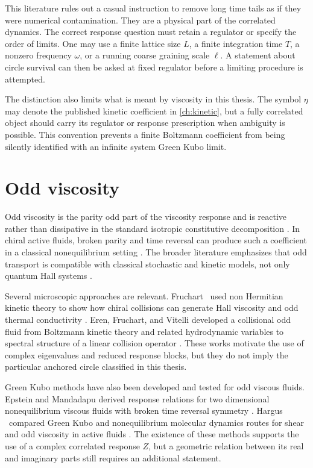 This literature rules out a casual instruction to remove long time tails as if they were numerical contamination. They are a physical part of the correlated dynamics. The correct response question must retain a regulator or specify the order of limits. One may use a finite lattice size $L$, a finite integration time $T$, a nonzero frequency $\omega$, or a running coarse graining scale $\ell$. A statement about circle survival can then be asked at fixed regulator before a limiting procedure is attempted.

The distinction also limits what is meant by viscosity in this thesis. The symbol $\eta$ may denote the published kinetic coefficient in \cref{ch:kinetic}, but a fully correlated object should carry its regulator or response prescription when ambiguity is possible. This convention prevents a finite Boltzmann coefficient from being silently identified with an infinite system Green Kubo limit.

\section{Odd viscosity}
Odd viscosity is the parity odd part of the viscosity response and is reactive rather than dissipative in the standard isotropic constitutive decomposition \cite{Avron1998}. In chiral active fluids, broken parity and time reversal can produce such a coefficient in a classical nonequilibrium setting \cite{Banerjee2017}. The broader literature emphasizes that odd transport is compatible with classical stochastic and kinetic models, not only quantum Hall systems \cite{FruchartReview2023}.

Several microscopic approaches are relevant. Fruchart \etal\ used non Hermitian kinetic theory to show how chiral collisions can generate Hall viscosity and odd thermal conductivity \cite{Fruchart2022}. Eren, Fruchart, and Vitelli developed a collisional odd fluid from Boltzmann kinetic theory and related hydrodynamic variables to spectral structure of a linear collision operator \cite{Eren2026}. These works motivate the use of complex eigenvalues and reduced response blocks, but they do not imply the particular anchored circle classified in this thesis.

Green Kubo methods have also been developed and tested for odd viscous fluids. Epstein and Mandadapu derived response relations for two dimensional nonequilibrium viscous fluids with broken time reversal symmetry \cite{Epstein2020}. Hargus \etal\ compared Green Kubo and nonequilibrium molecular dynamics routes for shear and odd viscosity in active fluids \cite{Hargus2020}. The existence of these methods supports the use of a complex correlated response $Z$, but a geometric relation between its real and imaginary parts still requires an additional statement.

